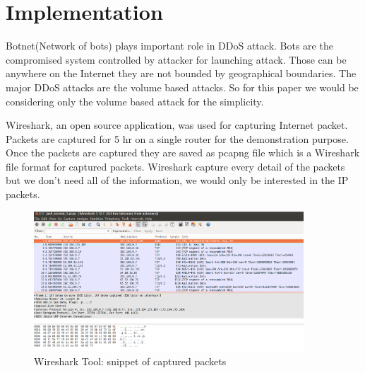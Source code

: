 \documentclass[10pt,oneside,a4paper]{report}
\begin{document}
\chapter{Implementation}
Botnet(Network  of bots) plays important role in DDoS attack. Bots are the compromised system controlled by attacker for launching attack. Those can be anywhere on the Internet they are not bounded by geographical boundaries. The major DDoS attacks are the volume based attacks. So for this paper we would be considering only the volume based attack for the simplicity.\par
Wireshark, an open source application, was used for capturing Internet packet. Packets are captured for 5 hr on a single router for the demonstration purpose. Once the packets are captured they are saved as pcapng file which is a Wireshark file format for captured packets. Wireshark capture every detail of the packets but we don't need all of the information, we would only be interested in the IP packets.\par
\begin{figure}[H]
  \centering
    \includegraphics[width=0.90\textwidth]{Wireshark_Tools.png}
    \caption{Wireshark Tool: snippet of captured packets}
\end{figure}
\end{document}
